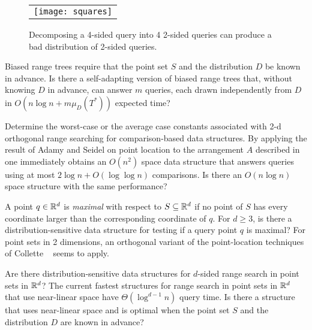 \documentclass[lotsofwhite,charterfonts]{patmorin}
\begin{document}
\begin{figure}
  \begin{center}
    \begin{tabular}{c}
      \texttt{[image: squares]}
    \end{tabular}
  \end{center}
  \caption{Decomposing a 4-sided query into 4 2-sided queries can
           produce a bad distribution of 2-sided queries.}
\end{figure}



\begin{op}
Biased range trees require that the point set $S$ and the
distribution $D$ be known in advance.  Is
there a self-adapting version of biased range trees that, without
knowing $D$ in advance, can answer $m$ queries, each drawn
independently from $D$ in $O(n\log n+ m\mu_D(T^*))$ expected time?
\end{op}

\begin{op}
Determine the worst-case or the average case constants associated with
2-d orthogonal range searching for comparison-based data structures.
By applying the result of Adamy and Seidel \cite{as98} on point
location to the arrangement $A$ described in  one
immediately obtains an $O(n^2)$ space data structure that answers
queries using at most $2\log n + O(\log\log n)$ comparisons.  Is there
an $O(n\log n)$ space structure with the same performance?
\end{op}

\begin{op}
A point $q\in \mathbb{R}^d$ is \emph{maximal} with respect to $S\subseteq\mathbb{R}^d$
if no point of $S$ has every coordinate larger than the corresponding
coordinate of $q$. For $d\ge 3$,  is there a distribution-sensitive 
data structure for
testing if a query point $q$ is maximal?  For point sets in 2
dimensions, an orthogonal variant of the point-location techniques of Collette
\etal\ \cite{cdilm08} seems to apply. 
\end{op}


\begin{op}
Are there distribution-sensitive data structures for $d$-sided range
search in point sets in $\mathbb{R}^d$?  The current fastest structures
for range search in point sets in $\mathbb{R}^d$ that use near-linear space have
$\Theta(\log^{d-1} n)$ query time.  Is there a structure that uses
near-linear space and is optimal
when the point set $S$ and the distribution $D$ are known in advance?
\end{op}




\end{document}
